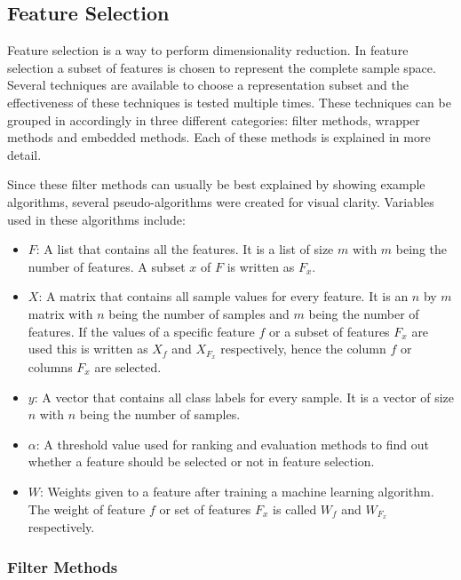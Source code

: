 \documentclass[10pt,a4paper]{article}
\begin{document}
	\subsection{Feature Selection}
	\label{subsec:FeatureSelection}
	
	Feature selection is a way to perform dimensionality reduction. In feature selection a subset of features is chosen to represent the complete sample space\cite{Guyon2006}. Several techniques are available to choose a representation subset and the effectiveness of these techniques is tested multiple times\cite{CATAL20091040, molina2002feature, chandrashekar2014survey}. These techniques can be grouped in accordingly in three different categories: filter methods, wrapper methods and embedded methods\cite{saeys2007review}. Each of these methods is explained in more detail.

	Since these filter methods can usually be best explained by showing example algorithms, several pseudo-algorithms were created for visual clarity. Variables used in these algorithms include:
	\begin{itemize}
		\item \textit{$F$}: A list that contains all the features. It is a list of size $m$ with $m$ being the number of features. A subset $x$ of $F$ is written as $F_x$.
		\item \textit{$X$}: A matrix that contains all sample values for every feature. It is an $n$ by $m$ matrix with $n$ being the number of samples and $m$ being the number of features. If the values of a specific feature $f$ or a subset of features $F_x$ are used this is written as $X_f$ and $X_{F_x}$ respectively, hence the column $f$ or columns $F_x$ are selected.
		\item \textit{$y$}: A vector that contains all class labels for every sample. It is a vector of size $n$ with $n$ being the number of samples.
		\item \textit{$\alpha$}: A threshold value used for ranking and evaluation methods to find out whether a feature should be selected or not in feature selection.
		\item \textit{$W$}: Weights given to a feature after training a machine learning algorithm. The weight of feature $f$ or set of features $F_x$ is called $W_f$ and $W_{F_x}$ respectively.
	\end{itemize}
	
	\subsubsection{Filter Methods}
	\label{subsec:FilterMethods}
	
\end{document}
